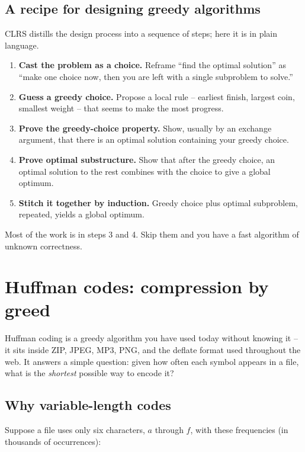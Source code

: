\subsection{A recipe for designing greedy algorithms}

CLRS distills the design process into a sequence of steps; here it is in plain
language.

\begin{enumerate}
\item \textbf{Cast the problem as a choice.} Reframe ``find the optimal solution''
  as ``make one choice now, then you are left with a single subproblem to solve.''
\item \textbf{Guess a greedy choice.} Propose a local rule -- earliest finish,
  largest coin, smallest weight -- that seems to make the most progress.
\item \textbf{Prove the greedy-choice property.} Show, usually by an exchange
  argument, that there is an optimal solution containing your greedy choice.
\item \textbf{Prove optimal substructure.} Show that after the greedy choice, an
  optimal solution to the rest combines with the choice to give a global optimum.
\item \textbf{Stitch it together by induction.} Greedy choice plus optimal
  subproblem, repeated, yields a global optimum.
\end{enumerate}

Most of the work is in steps 3 and 4. Skip them and you
have a fast algorithm of unknown correctness.

\section{Huffman codes: compression by greed}

Huffman coding is a greedy algorithm you have used
today without knowing it -- it sits inside ZIP, JPEG, MP3, PNG, and the deflate
format used throughout the web. It answers a simple question: given how
often each symbol appears in a file, what is the \emph{shortest} possible way to
encode it?

\subsection{Why variable-length codes}

Suppose a file uses only six characters, $a$ through $f$, with these frequencies
(in thousands of occurrences):

